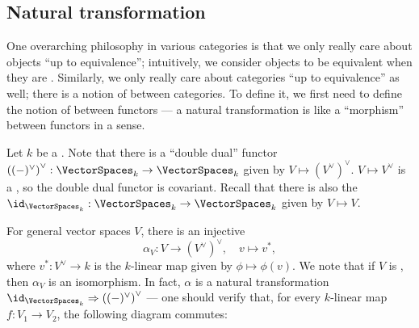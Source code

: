 




\subsection{Natural transformation}

One overarching philosophy in various categories is that we only really care about objects ``up to equivalence'';  intuitively, we consider objects to be equivalent when they are . Similarly, we only really care about categories ``up to equivalence'' as well; there is a notion of  between categories. To define it, we first need to define the notion of  between functors --- a natural transformation is like a ``morphism'' between functors in a sense. 



\begin{example}
    Let $k$ be a . Note that there is a ``double dual'' functor $\left((-)^{\vee} \right)^\vee:\VectorSpaces_k \to \VectorSpaces_k$ given by $V \mapsto (V^{\vee})^\vee$.  $V \mapsto V^\vee$ is a , so the double dual functor is covariant. Recall that there is also the  $\id_{\VectorSpaces_k}: \VectorSpaces_k \to \VectorSpaces_k$ given by $V \mapsto V$.  

    For general vector spaces $V$, there is an injective 
    $$\alpha_V: V \to (V^{\vee})^\vee, \quad v \mapsto v^*, $$
    where $v^*: V^\vee \to k$ is the $k$-linear map given by $\phi \mapsto \phi(v)$. We note that if $V$ is , then $\alpha_V$ is an isomorphism. In fact, $\alpha$ is a natural transformation $\id_{\VectorSpaces_k} \Rightarrow \left( (-)^\vee \right)^\vee$ --- one should verify that, for every $k$-linear map $f: V_1 \to V_2$, the following diagram commutes:
    \begin{center}
    \end{center}
\end{example}

